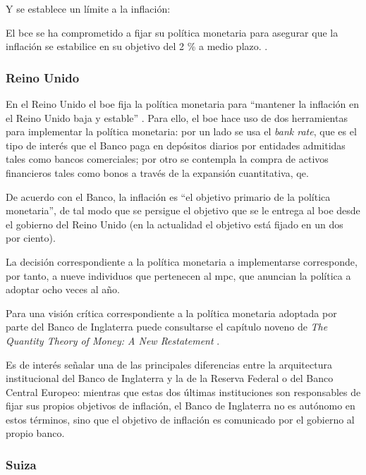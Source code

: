\documentclass[titlepage, 12pt]{article}
\begin{document}
Y se establece un límite a la inflación:
\begin{displayquote}
    El \acrshort{bce} se ha comprometido a fijar su política monetaria para asegurar que la inflación se estabilice en su objetivo del 2 \% a medio plazo. \autocite{ecb2021}.
\end{displayquote}

\subsubsection{Reino Unido}

En el Reino Unido el \acrfull{boe} fija la política monetaria para \enquote{mantener la inflación en el Reino Unido baja y estable} \autocite{boe}. Para ello, el \acrlong{boe} hace uso de dos herramientas para implementar la política monetaria: por un lado se usa el \textit{bank rate}, que es el tipo de interés que el Banco paga en depósitos diarios por entidades admitidas tales como bancos comerciales; por otro se contempla la compra de activos financieros tales como bonos a través de la expansión cuantitativa, \acrfull{qe}.

De acuerdo con el Banco, la inflación es \enquote{el objetivo primario de la política monetaria}, de tal modo que se persigue el objetivo que se le entrega al \acrshort{boe} desde el gobierno del Reino Unido (en la actualidad el objetivo está fijado en un dos por ciento).

La decisión correspondiente a la política monetaria a implementarse corresponde, por tanto, a nueve individuos que pertenecen al \acrfull{mpc}, que anuncian la política a adoptar ocho veces al año.

Para una visión crítica correspondiente a la política monetaria adoptada por parte del Banco de Inglaterra puede consultarse el capítulo noveno de \textit{The Quantity Theory of Money: A New Restatement} \autocite[109-129]{congdon2024}.

Es de interés señalar una de las principales diferencias entre la arquitectura institucional del Banco de Inglaterra y la de la Reserva Federal o del Banco Central Europeo: mientras que estas dos últimas instituciones son responsables de fijar sus propios objetivos de inflación, el Banco de Inglaterra no es autónomo en estos términos, sino que el objetivo de inflación es comunicado por el gobierno al propio banco.

\subsubsection{Suiza}
\end{document}
